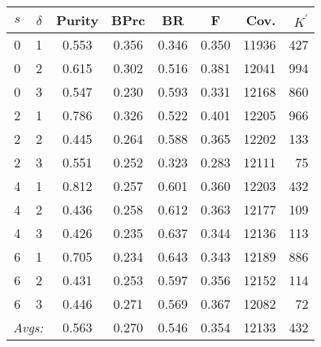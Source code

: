 \begin{table}[!ht]
{\small
\centering
\setlength{\extrarowheight}{4pt}
\begin{tabular}{cc|ccccrr}
$s$ & $\delta$ & Purity &  BPrc & BR & F & Cov. & $K^{\prime}$ \\ \hline\hline
0 & 1 & 0.553 & 0.356 & 0.346 & 0.350 & 11936 & 427 \\
0 & 2 & 0.615 & 0.302 & 0.516 & 0.381 & 12041 & 994 \\%
0 & 3 & 0.547 & 0.230 & 0.593 & 0.331 & 12168 & 860 \\ \hline %
2 & 1 & 0.786 & 0.326 & 0.522 & 0.401 & 12205 & 966 \\%
2 & 2 & 0.445 & 0.264 & 0.588 & 0.365 & 12202 & 133 \\%
2 & 3 & 0.551 & 0.252 & 0.323 & 0.283 & 12111 & 75 \\ \hline %
4 & 1 & 0.812 & 0.257 & 0.601 & 0.360 & 12203 & 432 \\%
4 & 2 & 0.436 & 0.258 & 0.612 & 0.363 & 12177 & 109 \\%
4 & 3 & 0.426 & 0.235 & 0.637 & 0.344 & 12136 & 113 \\ \hline %
6 & 1 & 0.705 & 0.234 & 0.643 & 0.343 & 12189 & 886 \\%
6 & 2 & 0.431 & 0.253 & 0.597 & 0.356 & 12152 & 114 \\%
6 & 3 & 0.446 & 0.271 & 0.569 & 0.367 & 12082 & 72 \\ \hline \hline%
 \multicolumn{2}{r|}{\textit{Avgs:}} & 0.563 & 0.270 & 0.546 & 0.354 & 12133 & 432 \\
\end{tabular}
}
\end{table}
